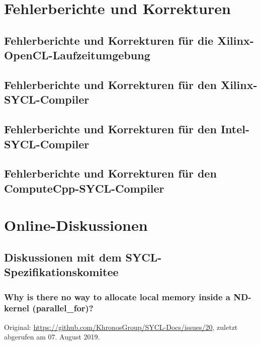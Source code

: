 \chapter{Fehlerberichte und Korrekturen}
\label{anhang:fehler}

\section{Fehlerberichte und Korrekturen für die Xilinx-OpenCL-Laufzeitumgebung}
\label{anhang:fehler:xrt}

\section{Fehlerberichte und Korrekturen für den Xilinx-SYCL-Compiler}
\label{anhang:fehler:xilinx}

\section{Fehlerberichte und Korrekturen für den Intel-SYCL-Compiler}
\label{anhang:fehler:intel}

\section{Fehlerberichte und Korrekturen für den ComputeCpp-SYCL-Compiler}
\label{anhang:fehler:computecpp}

\chapter{Online-Diskussionen}\label{anhang:diskussionen}

\section{Diskussionen mit dem SYCL-Spezifikationskomitee}
\label{anhang:diskussionen:syclspec}

\subsection{Why is there no way to allocate local memory inside a ND-kernel
            (parallel\_for)?}\label{anhang:diskussionen:syclspec:staticshared}

Original: \url{https://github.com/KhronosGroup/SYCL-Docs/issues/20}, zuletzt
abgerufen am 07. August 2019.


